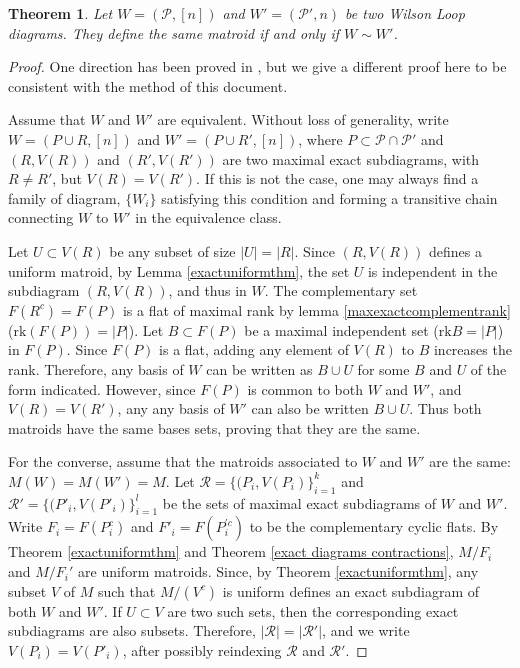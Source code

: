 \documentclass[11pt]{article}
\newcommand{\rk}{\textrm{rk} }
\newcommand{\cP}{\mathcal{P}}
\newtheorem{thm}{Theorem}[section]
\theoremstyle{remark}
\theoremstyle{definition}
\begin{document}
\begin{thm}\label{same matroid iff equiv}
Let $W= (\cP, [n])$ and $W'= (\cP', n)$ be two Wilson Loop diagrams. They define the same matroid if and only if $W \sim W'$.
\end{thm}

\begin{proof}
One direction has been proved in \cite[Theorem 1.18]{wilsonloop}, but we give a different proof here to be consistent with the method of this document.

Assume that $W$ and $W'$ are equivalent. Without loss of generality, write $W = (P \cup R, [n])$ and $W' = (P \cup R', [n])$, where $P \subset \cP \cap \cP'$ and $(R, V(R))$ and $(R', V(R'))$ are two maximal exact subdiagrams, with $R \neq R'$, but $V(R) = V(R')$. If this is not the case, one may always find a family of diagram, $\{W_i\}$ satisfying this condition and forming a transitive chain connecting $W$ to $W'$ in the equivalence class.

Let $U \subset V(R)$ be any subset of size $|U| = |R|$. Since $(R, V(R))$ defines a uniform matroid, by Lemma \ref{exactuniformthm}, the set $U$ is independent in the subdiagram $(R, V(R))$, and thus in $W$. The complementary set $F(R^c) = F(P)$ is a flat of maximal rank by lemma \ref{maxexactcomplementrank} ($\rk(F(P)) = |P|$). Let $B \subset F(P)$ be a maximal independent set ($\rk B = |P|$) in $F(P)$. Since $F(P)$ is a flat, adding any element of $V(R)$ to $B$ increases the rank. Therefore, any basis of $W$ can be written as $B \cup U$ for some $B$ and $U$ of the form indicated. However, since $F(P)$ is common to both $W$ and $W'$, and $V(R) = V(R')$, any any basis of $W'$ can also be written $B \cup U$. Thus both matroids have the same bases sets, proving that they are the same.

For the converse, assume that the matroids associated to $W$ and $W'$ are the same: $M(W) = M(W')= M$. Let $\mathcal{R} = \{(P_i, V(P_i)\}_{i=1}^k$ and $\mathcal{R}' = \{(P'_i, V(P'_i)\}_{i=1}^l$ be the sets of maximal exact subdiagrams of $W$ and $W'$. Write $F_i = F(P_i^c)$ and $F'_i = F(P^{'c}_i)$ to be the complementary cyclic flats. By Theorem \ref{exactuniformthm} and Theorem \ref{exact diagrams contractions},  $M/F_i$ and $M/F_i'$ are uniform matroids. Since, by Theorem \ref{exactuniformthm}, any subset $V$ of $M$ such that $M/(V^c)$ is uniform defines an exact subdiagram of both $W$ and $W'$. If $U \subset V$ are two such sets, then the corresponding exact subdiagrams are also subsets. Therefore, $|\mathcal{R}| = |\mathcal{R}'|$, and we write $V(P_i) = V(P'_i)$, after possibly reindexing $\mathcal{R}$ and $\mathcal{R}'$.


\end{proof}
\end{document}
